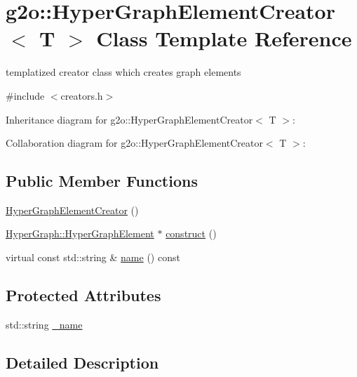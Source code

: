 \hypertarget{classg2o_1_1HyperGraphElementCreator}{}\section{g2o\+:\+:Hyper\+Graph\+Element\+Creator$<$ T $>$ Class Template Reference}
\label{classg2o_1_1HyperGraphElementCreator}


templatized creator class which creates graph elements  




{\ttfamily \#include $<$creators.\+h$>$}



Inheritance diagram for g2o\+:\+:Hyper\+Graph\+Element\+Creator$<$ T $>$\+:


Collaboration diagram for g2o\+:\+:Hyper\+Graph\+Element\+Creator$<$ T $>$\+:
\subsection*{Public Member Functions}
\begin{DoxyCompactItemize}
\item 
\hyperlink{classg2o_1_1HyperGraphElementCreator_aacaa6cfc040649e5802bfe07240f242f}{Hyper\+Graph\+Element\+Creator} ()
\item 
\hyperlink{structg2o_1_1HyperGraph_1_1HyperGraphElement}{Hyper\+Graph\+::\+Hyper\+Graph\+Element} $\ast$ \hyperlink{classg2o_1_1HyperGraphElementCreator_af5e58366dd05b49700076e0c4ace31e3}{construct} ()
\item 
virtual const std\+::string \& \hyperlink{classg2o_1_1HyperGraphElementCreator_a48df4ada5c8540e65e6e4925b7a00a04}{name} () const 
\end{DoxyCompactItemize}
\subsection*{Protected Attributes}
\begin{DoxyCompactItemize}
\item 
std\+::string \hyperlink{classg2o_1_1HyperGraphElementCreator_abbcc42de74a57d80b586dd843255ebae}{\+\_\+name}
\end{DoxyCompactItemize}


\subsection{Detailed Description}
